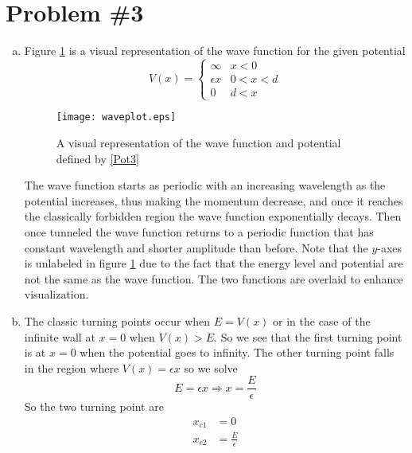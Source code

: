 \documentclass[11pt]{article}
\numberwithin{equation}{section}
\begin{document}
\section{Problem \#3}
\begin{enumerate}[(a)]
\item
Figure \ref{waveplot} is a visual representation of the wave function for the given potential
\begin{equation}
V(x) = \left\{\begin{array}{cc}
                \infty         & x<0\\
                \epsilon x     & 0<x<d\\
                0              & d<x
                \end{array}\right.
\label{Pot3}
\end{equation}
\begin{figure}
\centering
\texttt{[image: waveplot.eps]}
\caption{A visual representation of the wave function and potential defined by \ref{Pot3}}
\label{waveplot}
\end{figure}
The wave function starts as periodic with an increasing wavelength as the potential increases, thus making the momentum decrease, and once it reaches the classically forbidden region the wave function exponentially decays. Then once tunneled the wave function returns to a periodic function that has constant wavelength and shorter amplitude than before. Note that the $y$-axes is unlabeled in figure \ref{waveplot} due to the fact that the energy level and potential are not the same as the wave function. The two functions are overlaid to enhance visualization. 

\item
The classic turning points occur when $E=V(x)$ or in the case of the infinite wall at $x=0$ when $V(x) > E$. So we see that the first turning point is at $x=0$ when the potential goes to infinity. The other turning point falls in the region where $V(x) = \epsilon x$ so we solve
$$E = \epsilon x \Rightarrow x = \frac{E}{\epsilon}$$
So the two turning point are
\begin{align*}
x_{c1} &= 0\\
x_{c2} &= \frac{E}{\epsilon}
\end{align*}


\end{enumerate}
\end{document}
